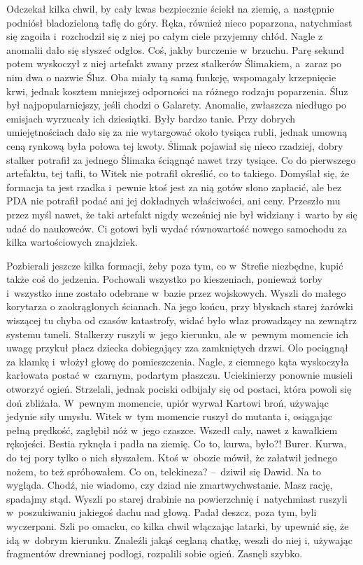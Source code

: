 \documentclass[../MAIN.tex]{subfiles}
\begin{document}
\pp
Odczekał kilka chwil, by cały kwas bezpiecznie ściekł na ziemię, a~następnie podniósł bladozieloną taflę do góry. Ręka, również nieco poparzona, natychmiast się zagoiła i~rozchodził się z niej po całym ciele przyjemny chłód. Nagle z anomalii dało się słyszeć odgłos. Coś, jakby burczenie w~brzuchu. Parę sekund potem wyskoczył z niej artefakt zwany przez stalkerów Ślimakiem, a~zaraz po nim dwa o nazwie Śluz. Oba miały tą samą funkcję, wspomagały krzepnięcie krwi, jednak kosztem mniejszej odporności na różnego rodzaju poparzenia. Śluz był najpopularniejszy, jeśli chodzi o Galarety. Anomalie, zwłaszcza niedługo po emisjach wyrzucały ich dziesiątki. Były bardzo tanie. Przy dobrych umiejętnościach dało się za nie wytargować około tysiąca rubli, jednak umowną ceną rynkową była połowa tej kwoty. Ślimak pojawiał się nieco rzadziej, dobry stalker potrafił za jednego Ślimaka ściągnąć nawet trzy tysiące.
\pp
Co do pierwszego artefaktu, tej tafli, to Witek nie potrafił określić, co to takiego. Domyślał się, że formacja ta jest rzadka i~pewnie ktoś jest za nią gotów słono zapłacić, ale bez PDA nie potrafił podać ani jej dokładnych właściwości, ani ceny. Przeszło mu przez myśl nawet, że taki artefakt nigdy wcześniej nie był widziany i~warto by się udać do naukowców. Ci gotowi byli wydać równowartość nowego samochodu za kilka wartościowych znajdziek.

Pozbierali jeszcze kilka formacji, żeby poza tym, co w~Strefie niezbędne, kupić także coś do jedzenia. Pochowali wszystko po kieszeniach, ponieważ torby i~wszystko inne zostało odebrane w~bazie przez wojskowych. Wyszli do małego korytarza o zaokrąglonych ścianach. Na jego końcu, przy błyskach starej żarówki wiszącej tu chyba od czasów katastrofy, widać było właz prowadzący na zewnątrz systemu tuneli. Stalkerzy ruszyli w~jego kierunku, ale w~pewnym momencie ich uwagę przykuł płacz dziecka dobiegający zza zamkniętych drzwi. Olo pociągnął za klamkę i~włożył głowę do pomieszczenia. Nagle, z ciemnego kąta wyskoczyła karłowata postać w~czarnym, podartym płaszczu. Uciekinierzy ponownie musieli otworzyć ogień. Strzelali, jednak pociski odbijały się od postaci, która powoli się doń zbliżała. W~pewnym momencie, upiór wyrwał Kartowi broń, używając jedynie siły umysłu. Witek w~tym momencie ruszył do mutanta i, osiągając pełną prędkość, zagłębił nóż w~jego czaszce. Wszedł cały, nawet z kawałkiem rękojeści. Bestia ryknęła
i padła na ziemię.
\dd
\sd
\xx Co to, kurwa, było?!
\xx Burer. Kurwa, do tej pory tylko o nich słyszałem. Ktoś w~obozie mówił, że załatwił jednego nożem, to też spróbowałem.
\xx Co on, telekineza? --~dziwił się Dawid.
\xx Na to wygląda. Chodź, nie wiadomo, czy dziad nie zmartwychwstanie.
\xx Masz rację, spadajmy stąd.
\qd
\hspace{13.2em} Wyszli po starej drabinie na powierzchnię i~natychmiast ruszyli w~poszukiwaniu jakiegoś dachu nad głową. Padał deszcz, poza tym, byli wyczerpani. Szli po omacku, co kilka chwil włączając latarki, by upewnić się, że idą w~dobrym kierunku. Znaleźli jakąś ceglaną chatkę, weszli do niej i, używając fragmentów drewnianej podłogi, rozpalili sobie ogień. Zasnęli szybko.
\end{document}
